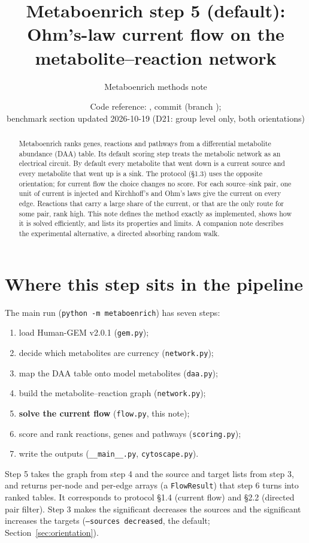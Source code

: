 \documentclass[11pt]{article}
\title{Metaboenrich step 5 (default):\\
Ohm's-law current flow on the metabolite--reaction network}
\author{Metaboenrich methods note}
\date{Code reference: \code{metaboenrich/flow.py}, commit \code{0f6c135} (branch \code{directed-rw});\\
benchmark section updated 2026-10-19 (D21: group level only, both orientations)}
\newcommand{\code}[1]{\texttt{#1}}
\begin{document}
\maketitle

\begin{abstract}
Metaboenrich ranks genes, reactions and pathways from a differential metabolite
abundance (DAA) table. Its default scoring step treats the metabolic network as an
electrical circuit. By default every metabolite that went down is a current source
and every metabolite that went up is a sink. The protocol (\S1.3) uses the opposite
orientation; for current flow the choice changes no score. For each source--sink
pair, one unit of current is injected and Kirchhoff's and Ohm's laws give the
current on every edge. Reactions that carry a large share of the current, or that
are the only route for some pair, rank high. This note defines the method exactly as implemented, shows how it is
solved efficiently, and lists its properties and limits. A companion note describes
the experimental alternative, a directed absorbing random walk.
\end{abstract}

\tableofcontents

\section{Where this step sits in the pipeline}

The main run (\code{python -m metaboenrich}) has seven steps:
\begin{enumerate}[nosep]
  \item load Human-GEM v2.0.1 (\code{gem.py});
  \item decide which metabolites are currency (\code{network.py});
  \item map the DAA table onto model metabolites (\code{daa.py});
  \item build the metabolite--reaction graph (\code{network.py});
  \item \textbf{solve the current flow} (\code{flow.py}, this note);
  \item score and rank reactions, genes and pathways (\code{scoring.py});
  \item write the outputs (\code{\_\_main\_\_.py}, \code{cytoscape.py}).
\end{enumerate}
Step 5 takes the graph from step 4 and the source and target lists from step 3, and
returns per-node and per-edge arrays (a \code{FlowResult}) that step 6 turns into
ranked tables. It corresponds to protocol \S1.4 (current flow) and \S2.2 (directed
pair filter). Step 3 makes the significant decreases the sources and the
significant increases the targets (\code{--sources decreased}, the default;
Section~\ref{sec:orientation}).
\end{document}
